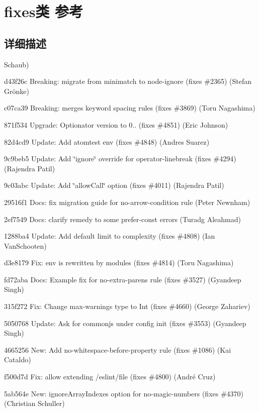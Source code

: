 \hypertarget{classfixes}{}\section{fixes类 参考}
\label{classfixes}


\subsection{详细描述}
Schaub)
\begin{DoxyItemize}
\item d43f26c Breaking\+: migrate from minimatch to node-\/ignore (fixes \#2365) (Stefan Grönke)
\item c07ca39 Breaking\+: merges keyword spacing rules (fixes \#3869) (Toru Nagashima)
\item 871f534 Upgrade\+: Optionator version to 0.. (fixes \#4851) (Eric Johnson)
\item 82d4cd9 Update\+: Add atomtest env (fixes \#4848) (Andres Suarez)
\item 9c9beb5 Update\+: Add \char`\"{}ignore\char`\"{} override for operator-\/linebreak (fixes \#4294) (Rajendra Patil)
\item 9c03abc Update\+: Add \char`\"{}allow\+Call\char`\"{} option (fixes \#4011) (Rajendra Patil)
\item 29516f1 Docs\+: fix migration guide for no-\/arrow-\/condition rule (Peter Newnham)
\item 2ef7549 Docs\+: clarify remedy to some prefer-\/const errors (Turadg Aleahmad)
\item 1288ba4 Update\+: Add default limit to {\ttfamily complexity} (fixes \#4808) (Ian Van\+Schooten)
\item d3e8179 Fix\+: env is rewritten by modules (fixes \#4814) (Toru Nagashima)
\item fd72aba Docs\+: Example fix for {\ttfamily no-\/extra-\/parens} rule (fixes \#3527) (Gyandeep Singh)
\item 315f272 Fix\+: Change max-\/warnings type to Int (fixes \#4660) (George Zahariev)
\item 5050768 Update\+: Ask for {\ttfamily commonjs} under config init (fixes \#3553) (Gyandeep Singh)
\item 4665256 New\+: Add no-\/whitespace-\/before-\/property rule (fixes \#1086) (Kai Cataldo)
\item f500d7d Fix\+: allow extending /eslint/file (fixes \#4800) (André Cruz)
\item 5ab564e New\+: \textquotesingle{}ignore\+Array\+Indexes\textquotesingle{} option for \textquotesingle{}no-\/magic-\/numbers\textquotesingle{} (fixes \#4370) (Christian Schuller)

\end{DoxyItemize}
